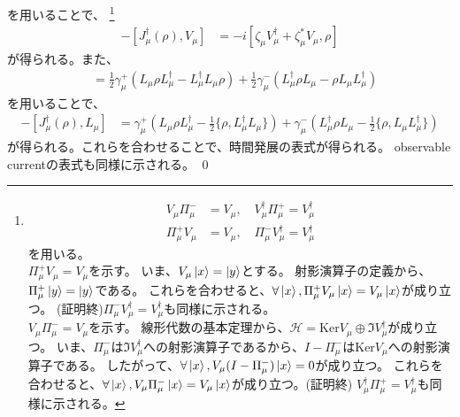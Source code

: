 \documentclass[a4paper,11pt]{jsarticle}
\numberwithin{equation}{section}
\begin{document}
を用いることで、
\footnote{
    \begin{align}
        V_{\mu}\Pi_{\mu}^{-} &= V_{\mu},\quad  V_{\mu}^{\dagger}\Pi_{\mu}^{+} = V_{\mu}^{\dagger}\\
        \Pi^{+}_{\mu} V_{\mu} &= V_{\mu},\quad \Pi^{-}_{\mu} V_{\mu}^{\dagger} = V_{\mu}^{\dagger}
    \end{align}
    を用いる。\\
    $\Pi_{\mu}^{+} V_{\mu} = V_{\mu}$を示す。
    いま、$V_{\mu} \ket{x} = \ket{y}$とする。
    射影演算子の定義から、$\Pi_{\mu}^{+} \ket{y} = \ket{y}$である。
    これらを合わせると、$\forall \ket{x}, \Pi_{\mu}^{+} V_{\mu} \ket{x} = V_{\mu} \ket{x}$が成り立つ。
    (証明終)$\Pi_{\mu}^{-} V_{\mu}^{\dagger} = V_{\mu}^{\dagger}$も同様に示される。
    \\
    $V_{\mu}\Pi_{\mu}^{-} = V_{\mu}$を示す。
    線形代数の基本定理から、$\mathcal{H} = \mathrm{Ker} V_{\mu} \oplus \Im V_{\mu}^{\dagger}$が成り立つ。
    いま、$\Pi_{\mu}^{-}$は$\Im V_{\mu}^{\dagger}$への射影演算子であるから、$I-\Pi_{\mu}^{-}$は$\mathrm{Ker} V_{\mu}$への射影演算子である。
    したがって、$\forall \ket{x}, V_{\mu}(I-\Pi_{\mu}^{-})\ket{x} = 0$が成り立つ。
    これらを合わせると、$\forall \ket{x}, V_{\mu}\Pi_{\mu}^{-} \ket{x} = V_{\mu} \ket{x}$が成り立つ。(証明終)
    $V_{\mu}^{\dagger}\Pi_{\mu}^{+} = V_{\mu}^{\dagger}$も同様に示される。
}
\begin{align}
[J_{\mu}(\rho), V_{\mu}^{\dagger}] - [J_{\mu}^{\dagger}(\rho), V_{\mu}]
&= -i [\zeta_{\mu} V_{\mu}^{\dagger} + \zeta_{\mu}^{*} V_{\mu}, \rho]
\end{align}
が得られる。また、
\begin{align}
[J_{\mu}(\rho), L_{\mu}^{\dagger}]
&= \frac{1}{2} \gamma_{\mu}^{+} (L_{\mu} \rho L_{\mu}^{\dagger} - L_{\mu}^{\dagger} L_{\mu} \rho)
+ \frac{1}{2} \gamma_{\mu}^{-} (L_{\mu}^{\dagger} \rho L_{\mu} - \rho L_{\mu} L_{\mu}^{\dagger}) 
\end{align}
を用いることで、
\begin{align}
[J_{\mu}(\rho), L_{\mu}^{\dagger}] - [J_{\mu}^{\dagger}(\rho), L_{\mu}]
&= \gamma_{\mu}^{+} 
\left( L_{\mu} \rho L_{\mu}^{\dagger} - \frac{1}{2} \{ \rho, L_{\mu}^{\dagger} L_{\mu} \} \right)
+ \gamma_{\mu}^{-}
\left( L_{\mu}^{\dagger} \rho L_{\mu} - \frac{1}{2} \{ \rho, L_{\mu} L_{\mu}^{\dagger} \} \right)
\end{align}
が得られる。これらを合わせることで、時間発展の表式が得られる。
observable currentの表式も同様に示される。
\qed\\
\end{document}
